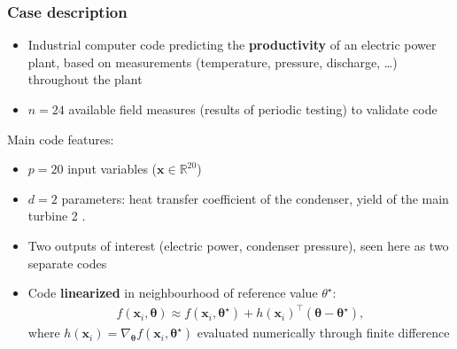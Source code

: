 \documentclass[nopagenumber,9pt]{beamer}
\newcommand{\bs}{\boldsymbol}
\newcommand{\blue}{\textcolor{myblue}}
\begin{document}
\begin{frame}
 \frametitle{Case description}
\begin{itemize}
\item Industrial computer code predicting the \blue{\bf productivity} of an electric power plant, based on measurements (temperature, pressure, discharge, \ldots)  throughout the plant
\item $n=24$ available field measures (results of periodic testing) to validate code
\end{itemize}
Main code features:
\begin{itemize}
\item $p=20$ input variables ($\bs x \in \mathbb R^{20}$)
\item $d=2$ parameters: heat transfer coefficient of the condenser, yield of the main turbine 2 .
\item Two outputs of interest (electric power, condenser pressure), seen here as two separate codes 
\item Code \blue{\bf linearized} in neighbourhood of reference value $\theta^\star$:
\begin{eqnarray*}
f(\bs x_i,{\bs \theta}) \approx f(\bs x_i,\bs \theta^\star) + h(\bs x_i)^\top (\bs \theta-\bs \theta^\star),
\end{eqnarray*}
where $h(\bs x_i) = \nabla_{\bs \theta} f(\bs x_i,\bs \theta^\star)$ evaluated numerically through finite difference
\end{itemize}

\end{frame}
\end{document}
